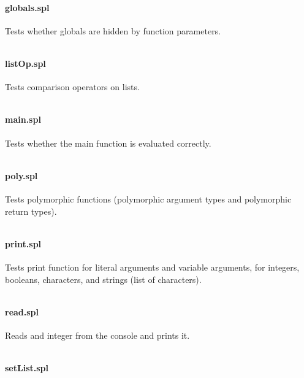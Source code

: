 \documentclass[a4paper]{article}
\begin{document}
\paragraph{globals.spl}
Tests whether globals are hidden by function parameters.
\begin{verbatim}\end{verbatim}

\paragraph{listOp.spl}
Tests comparison operators on lists.
\begin{verbatim}\end{verbatim}

\paragraph{main.spl}
Tests whether the main function is evaluated correctly.
\begin{verbatim}\end{verbatim}

\paragraph{poly.spl}
Tests polymorphic functions (polymorphic argument types and polymorphic return types).
\begin{verbatim}\end{verbatim}

\paragraph{print.spl}
Tests print function for literal arguments and variable arguments, for integers, booleans, characters, and strings (list of characters).
\begin{verbatim}\end{verbatim}

\paragraph{read.spl}
Reads and integer from the console and prints it.
\begin{verbatim}\end{verbatim}

\paragraph{setList.spl}
\begin{verbatim}\end{verbatim}
\end{document}
